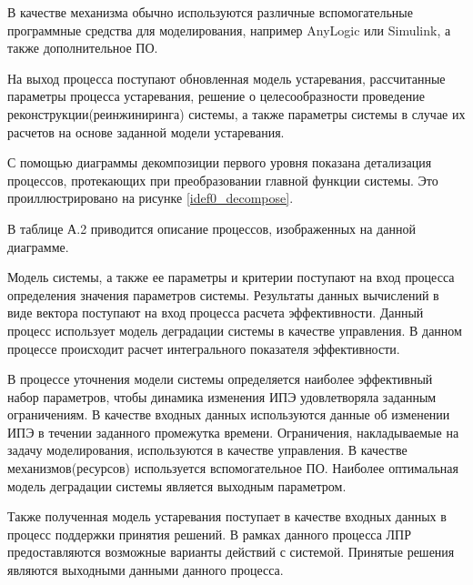 В качестве механизма обычно используются различные вспомогательные программные средства для моделирования, например AnyLogic или Simulink, а также дополнительное ПО.

На выход процесса поступают обновленная модель устаревания, рассчитанные параметры процесса устаревания, решение о целесообразности проведение реконструкции(реинжиниринга) системы, а также параметры системы в случае их расчетов на основе заданной модели устаревания.

С помощью диаграммы декомпозиции первого уровня показана детализация процессов, протекающих при преобразовании главной функции системы. Это проиллюстрировано на рисунке \ref{idef0_decompose}.

В таблице А.2 приводится описание процессов, изображенных на данной диаграмме.


Модель системы, а также ее параметры и критерии поступают на вход процесса определения значения параметров системы. 
Результаты данных вычислений в виде вектора поступают на вход процесса расчета эффективности. 
Данный процесс использует модель деградации системы в качестве управления. 
В данном процессе происходит расчет интегрального показателя эффективности. 

В процессе уточнения модели системы определяется наиболее эффективный набор параметров, чтобы динамика изменения ИПЭ удовлетворяла заданным ограничениям. 
В качестве входных данных используются данные об изменении ИПЭ в течении заданного промежутка времени. 
Ограничения, накладываемые на задачу моделирования, используются в качестве управления. 
В качестве механизмов(ресурсов) используется вспомогательное ПО. 
Наиболее оптимальная модель деградации системы является выходным параметром.

Также полученная модель устаревания поступает в качестве входных данных в процесс поддержки принятия решений. 
В рамках данного процесса ЛПР предоставляются возможные варианты действий с системой.
Принятые решения являются выходными данными данного процесса.



